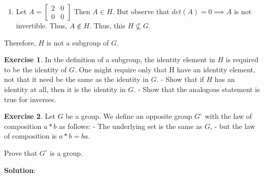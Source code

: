 \documentclass[
]{book}
\providecommand{\tightlist}{%
  \setlength{\itemsep}{0pt}\setlength{\parskip}{0pt}}
\theoremstyle{definition}
\theoremstyle{definition}
\theoremstyle{definition}
\newtheorem{exercise}{Exercise}[chapter]
\theoremstyle{definition}
\theoremstyle{remark}
\begin{document}
\begin{enumerate}
\def\labelenumi{(\alph{enumi})}
\setcounter{enumi}{4}
\tightlist
\item
  Let \(A=\begin{bmatrix} 2 & 0 \\ 0 & 0 \end{bmatrix}\) Then \(A\in H\). But observe that \(det(A)=0\implies A\) is not invertible. Thus, \(A\not\in H\). Thus, this \(H \not\subseteq G\).
\end{enumerate}

Therefore, \(H\) is not a subgroup of \(G\).

\begin{exercise}
\protect\hypertarget{exr:unnamed-chunk-66}{}\label{exr:unnamed-chunk-66}In the definition of a subgroup, the identity element in \(H\) is required to be the identity
of \(G\). One might require only that H have an identity element, not that it need be the
same as the identity in \(G\).
- Show that if \(H\) has an identity at all, then it is the identity in \(G\).
- Show that the analogous statement is true for inverses.
\end{exercise}

\begin{exercise}
\protect\hypertarget{exr:unnamed-chunk-67}{}\label{exr:unnamed-chunk-67}Let \(G\) be a group. We define an opposite group \(G^{\circ}\) with the law of composition \(a * b\) as follows:
- The underlying set is the same as \(G\),
- but the law of composition is \(a * b = ba\).

Prove that \(G^{\circ}\) is a group.
\end{exercise}

\textbf{Solution}:
\end{document}
